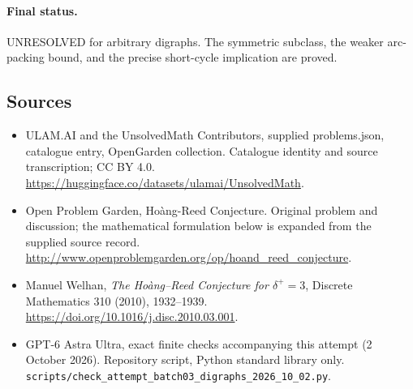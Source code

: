 \documentclass[11pt,a4paper]{article}
\begin{document}
\paragraph{Final status.}
UNRESOLVED for arbitrary digraphs. The symmetric subclass, the weaker
arc-packing bound, and the precise short-cycle implication are proved.
\subsection{Sources}
\begin{itemize}
\item[S1] ULAM.AI and the UnsolvedMath Contributors, supplied problems.json, catalogue entry, OpenGarden collection. Catalogue identity and source transcription; CC BY 4.0.
\url{https://huggingface.co/datasets/ulamai/UnsolvedMath}.
\item[S2] Open Problem Garden, Hoàng-Reed Conjecture. Original problem and discussion; the mathematical formulation below is expanded from the supplied source record.
\url{http://www.openproblemgarden.org/op/hoand_reed_conjecture}.
\item[S3] Manuel Welhan, \emph{The Ho\`ang--Reed Conjecture for $\delta^+=3$}, Discrete Mathematics 310 (2010), 1932--1939. \url{https://doi.org/10.1016/j.disc.2010.03.001}.
\item[S9] GPT-6 Astra Ultra, exact finite checks accompanying this attempt (2 October 2026). Repository script, Python standard library only. \texttt{scripts/check\_attempt\_batch03\_digraphs\_2026\_10\_02.py}.
\end{itemize}
\end{document}
